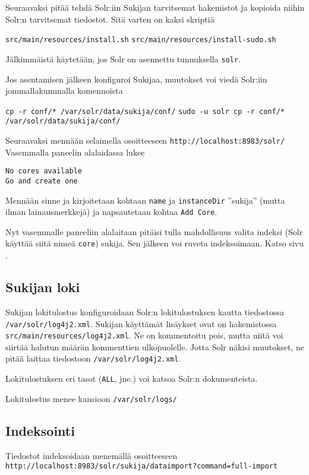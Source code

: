 \documentclass[12pt]{article}
\begin{document}
Seuraavaksi pitää tehdä Solr:iin Sukijan tarvitsemat hakemistot ja
kopioida niihin Solr:n tarvitsemat tiedostot. Sitä varten on kaksi
skriptiä

\verb=src/main/resources/install.sh=
\verb=src/main/resources/install-sudo.sh=

Jälkimmäistä käytetään, jos Solr on asennettu tunnuksella \verb=solr=.

Jos asentamisen jälkeen konfiguroi Sukijaa, muutokset voi viedä
Solr:iin jommallakummalla komennoista

\verb=cp -r conf/* /var/solr/data/sukija/conf/=
\verb=sudo -u solr cp -r conf/* /var/solr/data/sukija/conf/=


Seuraavaksi mennään selaimella osoitteeseen \verb=http://localhost:8983/solr/=
Vasemmalla paneelin alalaidassa lukee 

\begin{verbatim}
No cores available
Go and create one
\end{verbatim}

Mennään sinne ja kirjoitetaan kohtaan \verb=name= ja \verb=instanceDir=
''sukija'' (mutta ilman lainausmerkkejä) ja napsautetaan kohtaa
\verb=Add Core=.

Nyt vasemmalle paneeliin alalaitaan pitäisi tulla mahdollisuus valita
indeksi (Solr käyttää siitä nimeä \verb=core=) sukija. Sen jälkeen voi
ruveta indeksoimaan. Katso sivu .


\subsection*{Sukijan loki}

Sukijan lokitulostus konfiguroidaan Solr:n lokitulostuksen kautta
tiedostossa \verb=/var/solr/log4j2.xml=. Sukijan käyttämät lisäykset
ovat on hakemistossa \verb=src/main/resources/log4j2.xml=. Ne on
kommentoitu pois, mutta niitä voi siirtää halutun määrän kommenttien
ulkopuolelle. Jotta Solr näkisi muutokset, ne pitää laittaa tiedostoon
\verb=/var/solr/log4j2.xml=.

Lokitulostuksen eri tasot (\verb=ALL=, jne.) voi katsoa Solr:n
dokumenteista.

Lokitulostus menee kansioon \verb=/var/solr/logs/=


\subsection*{Indeksointi}

Tiedostot indeksoidaan menemällä osoitteeseen
\verb|http://localhost:8983/solr/sukija/dataimport?command=full-import|
\end{document}
